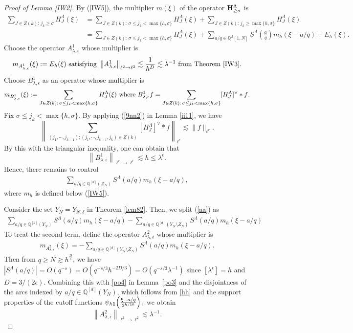 \documentclass[11 pt,letterpaper]{amsart}
\theoremstyle{plain}
\theoremstyle{definition}
\theoremstyle{remark} \theoremstyle{exam} \theoremstyle{ob}
\numberwithin{equation}{section}
\begin{document}
\begin{proof}[Proof of Lemma \ref{IW2}]
By (\ref{IW5}), the multiplier $m(\xi)$ of the operator $ {\bf H}_{\ge\sigma}^{\Lambda}$ is
\begin{align*} 
\sum_{J\in Z(k):\, j_k\ge  \sigma} H^{\Lambda}_{J}(\xi)&=\sum_{J\in Z(k):\, \sigma\le j_k< \max\{h,\sigma\} } H^{\Lambda}_{J}(\xi)+\sum_{J\in Z(k):\, j_k\ge \max\{h,\sigma\}} H^{\Lambda}_{J}(\xi)\\
&= \sum_{J\in Z(k):\, \sigma\le j_k< \max\{h,\sigma\} } H^{\Lambda}_{J}(\xi)+\sum_{a/q\in \mathbb{Q}^{\Lambda}[1,N]} S^{\Lambda}\!\left(\frac{a}{q}\right) m_{h}( \xi -a/q)  +E_{h}(\xi).
\end{align*}
 Choose  the operator $A_{\lambda, \epsilon}^{1}$ whose multiplier is $$m_{A^1_{\lambda,\epsilon}}(\xi):=E_{h}(\xi)\ \text{satisfying}\ \left\|A_{\lambda, \epsilon}^{1}\right\|_{\ell^{2} \rightarrow \ell^{2}}\lesssim  \frac{1}{h^{D}}\lesssim\lambda^{-1} \  \text{from Theorem \ref{IW3}}.$$
Choose
	$B_{\lambda, \epsilon}^{1}$ as an operator whose multiplier is
	$$m_{B_{\lambda,\epsilon}^1}(\xi):=\sum_{J\in Z(k):\, \sigma\le j_k< \max\{h,\sigma\} }  H^{\Lambda}_{J}(\xi) \ \text{where
		$ B_{\lambda,\epsilon}^1f=\sum_{J\in Z(k):\, \sigma\le j_k< \max\{h,\sigma\} }  [H^{\Lambda}_{J}]^{\vee}*f$.}
	$$  
Fix $ \sigma\le j_k< \max\{h,\sigma\}  $. By   
applying (\ref{9nn2}) in Lemma \ref{ii11}, we have $$ \left\|\sum_{(j_1,\cdots,j_{k-1}): (j_1,\cdots,j_{k-1},j_k)\in Z(k)} [H^{\Lambda}_J]^{\vee}*f \right\|_{\ell^r}\lesssim \|f\|_{\ell^r}.$$
 By this with the  triangular inequality,  one can obtain that $$\left\|B_{\lambda, \epsilon}^{1}\right\|_{\ell^{r} \rightarrow \ell^{r}} \lesssim h\le\lambda^{\epsilon}.$$
	Hence, there remains to control
	\begin{align}\label{aa}
		\sum_{a/q\in \mathbb{Q}^{[d]}(Z_N)} S^{\Lambda} (a/ q) m_{h}( \xi -a/q),
	\end{align}
	where  $m_h$ is defined below (\ref{IW5}).
	
	  Consider the set $Y_{N}=Y_{N, \delta}$ in Theorem \ref{lem82}.
Then, we split (\ref{aa}) as
	\begin{align}\label{aa1}
		 \sum_{a/q \in \mathbb{Q}^{[d]}(Y_N)}S^{\Lambda} (a/ q) m_{h}( \xi -a/q)-\sum_{a/q \in \mathbb{Q}^{[d]}(Y_N\setminus Z_N)}  S^{\Lambda} (a/ q) m_{h}( \xi -a/q)
	\end{align}
	To treat   the second term,
	define the operator $A_{\lambda, \epsilon}^{2}$ whose  multiplier is
	\begin{align*}
		m_{A_{\lambda, \epsilon}^{2}}(\xi)=	-\sum_{a/q \in \mathbb{Q}^{[d]}(Y_N\setminus Z_N)} S^{\Lambda}(a/ q) m_{h}   (\xi-a/q).
	\end{align*}
	Then from $q\ge N\gtrsim h^{\frac{D}{s}}$, we have  $|S^{\Lambda}(a / q)|=O(q^{-s})=O(q^{-s/3}h^{-2D/3})=O(q^{-s/3}\lambda^{-1})$ since $[\lambda^{\epsilon}]=h$ and $  D=3/(2\epsilon)$. 
	Combining this with \eqref{po4} in Lemma~\ref{po3} and the disjointness of the  arcs indexed by
	$a/q\in\mathbb{Q}^{[d]}(Y_N)$, which follows from \eqref{hh} and the support properties of the cutoff functions
$\psi_{h{\bf 1}}\!\left(\frac{\xi-a/q}{2^{h/10}}\right),$
	we obtain
	\[
	\left\|A_{\lambda,\epsilon}^{2}\right\|_{\ell^{2}\to\ell^{2}}
	\lesssim
	\lambda^{-1}.
	\]


\end{proof}
\end{document}
